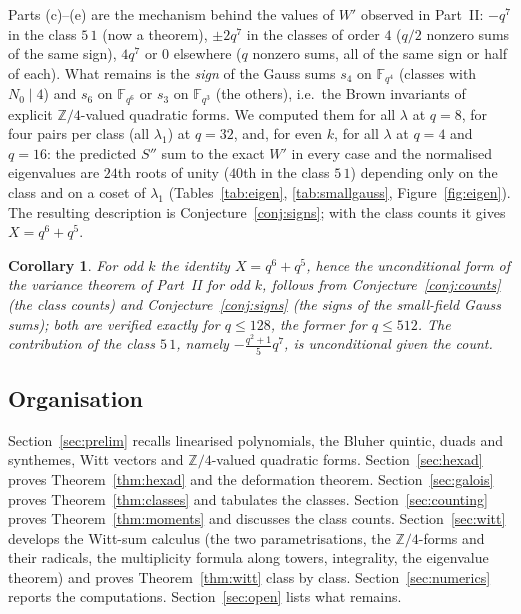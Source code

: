 ﻿\documentclass[12pt,a4paper]{amsart}
\newtheorem{corollary}[theorem]{Corollary}
\theoremstyle{definition}
\newcommand{\F}{\mathbb{F}}
\newcommand{\Z}{\mathbb{Z}}
\newcommand{\Spp}{S''}
\begin{document}
Parts (c)--(e) are the mechanism behind the values of $W'$ observed in Part~II: $-q^7$ in the class $5\,1$ (now a theorem), $\pm2q^7$ in the classes of order $4$ ($q/2$ nonzero sums of the same sign), $4q^7$ or $0$ elsewhere ($q$ nonzero sums, all of the same sign or half of each). What remains is the \emph{sign} of the Gauss sums $s_4$ on $\F_{q^4}$ (classes with $N_0\mid4$) and $s_6$ on $\F_{q^6}$ or $s_3$ on $\F_{q^3}$ (the others), i.e.\ the Brown invariants of explicit $\Z/4$-valued quadratic forms. We computed them for all $\lambda$ at $q=8$, for four pairs per class (all $\lambda_1$) at $q=32$, and, for even $k$, for all $\lambda$ at $q=4$ and $q=16$: the predicted $\Spp$ sum to the exact $W'$ in every case and the normalised eigenvalues are $24$th roots of unity ($40$th in the class $5\,1$) depending only on the class and on a coset of $\lambda_1$ (Tables~\ref{tab:eigen}, \ref{tab:smallgauss}, Figure~\ref{fig:eigen}). The resulting description is Conjecture~\ref{conj:signs}; with the class counts it gives $X=q^6+q^5$.

\begin{corollary}\label{cor:X}
For odd $k$ the identity $X=q^6+q^5$, hence the unconditional form of the variance theorem of Part~II for odd $k$, follows from Conjecture~\ref{conj:counts} (the class counts) and Conjecture~\ref{conj:signs} (the signs of the small-field Gauss sums); both are verified exactly for $q\le128$, the former for $q\le512$. The contribution of the class $5\,1$, namely $-\frac{q^2+1}{5}q^7$, is unconditional given the count.
\end{corollary}

\subsection{Organisation}
Section~\ref{sec:prelim} recalls linearised polynomials, the Bluher quintic, duads and synthemes, Witt vectors and $\Z/4$-valued quadratic forms. Section~\ref{sec:hexad} proves Theorem~\ref{thm:hexad} and the deformation theorem. Section~\ref{sec:galois} proves Theorem~\ref{thm:classes} and tabulates the classes. Section~\ref{sec:counting} proves Theorem~\ref{thm:moments} and discusses the class counts. Section~\ref{sec:witt} develops the Witt-sum calculus (the two parametrisations, the $\Z/4$-forms and their radicals, the multiplicity formula along towers, integrality, the eigenvalue theorem) and proves Theorem~\ref{thm:witt} class by class. Section~\ref{sec:numerics} reports the computations. Section~\ref{sec:open} lists what remains.
\end{document}
